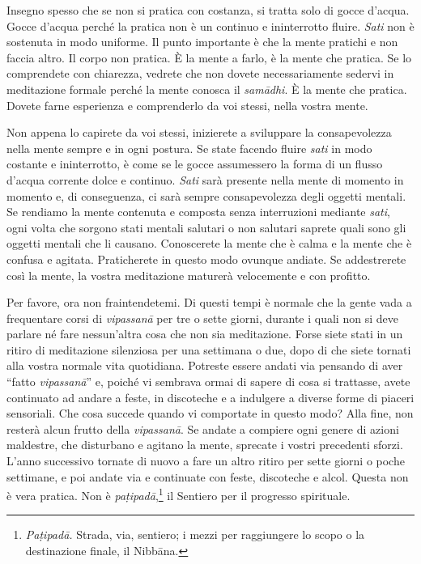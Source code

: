 Insegno spesso che se non si pratica con costanza, si tratta solo di
gocce d'acqua. Gocce d'acqua perché la pratica non è un continuo e
ininterrotto fluire. \emph{Sati} non è sostenuta in modo uniforme. Il
punto importante è che la mente pratichi e non faccia altro. Il corpo
non pratica. È la mente a farlo, è la mente che pratica. Se lo
comprendete con chiarezza, vedrete che non dovete necessariamente
sedervi in meditazione formale perché la mente conosca il
\emph{samādhi}. È la mente che pratica. Dovete farne esperienza e
comprenderlo da voi stessi, nella vostra mente.

Non appena lo capirete da voi stessi, inizierete a sviluppare la
consapevolezza nella mente sempre e in ogni postura. Se state facendo
fluire \emph{sati} in modo costante e ininterrotto, è come se le gocce
assumessero la forma di un flusso d'acqua corrente dolce e continuo.
\emph{Sati} sarà presente nella mente di momento in momento e, di
conseguenza, ci sarà sempre consapevolezza degli oggetti mentali. Se
rendiamo la mente contenuta e composta senza interruzioni mediante
\emph{sati}, ogni volta che sorgono stati mentali salutari o non
salutari saprete quali sono gli oggetti mentali che li causano.
Conoscerete la mente che è calma e la mente che è confusa e agitata.
Praticherete in questo modo ovunque andiate. Se addestrerete così la
mente, la vostra meditazione maturerà velocemente e con profitto.

Per favore, ora non fraintendetemi. Di questi tempi è normale che la
gente vada a frequentare corsi di \emph{vipassanā} per tre o sette
giorni, durante i quali non si deve parlare né fare nessun'altra cosa
che non sia meditazione. Forse siete stati in un ritiro di meditazione
silenziosa per una settimana o due, dopo di che siete tornati alla
vostra normale vita quotidiana. Potreste essere andati via pensando di
aver ``fatto \emph{vipassanā}'' e, poiché vi sembrava ormai di sapere di
cosa si trattasse, avete continuato ad andare a feste, in discoteche e a
indulgere a diverse forme di piaceri sensoriali. Che cosa succede quando
vi comportate in questo modo? Alla fine, non resterà alcun frutto della
\emph{vipassanā}. Se andate a compiere ogni genere di azioni maldestre,
che disturbano e agitano la mente, sprecate i vostri precedenti sforzi.
L'anno successivo tornate di nuovo a fare un altro ritiro per sette
giorni o poche settimane, e poi andate via e continuate con feste,
discoteche e alcol. Questa non è vera pratica. Non è
\emph{paṭipadā},\footnote{\emph{Paṭipadā.} Strada, via, sentiero; i
  mezzi per raggiungere lo scopo o la destinazione finale, il
  Nibbāna.} il Sentiero per il progresso spirituale.

